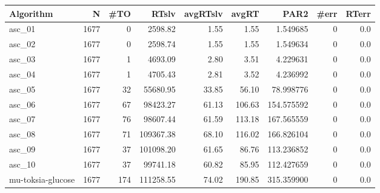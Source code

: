 \begin{tabular}{lrrrrrrrr}
\toprule
        Algorithm &    N &  \#TO &     RTslv &  avgRTslv &  avgRT &       PAR2 &  \#err &  RTerr \\
\midrule
           asc\_01 & 1677 &    0 &   2598.82 &      1.55 &   1.55 &   1.549685 &     0 &    0.0 \\
           asc\_02 & 1677 &    0 &   2598.74 &      1.55 &   1.55 &   1.549634 &     0 &    0.0 \\
           asc\_03 & 1677 &    1 &   4693.09 &      2.80 &   3.51 &   4.229631 &     0 &    0.0 \\
           asc\_04 & 1677 &    1 &   4705.43 &      2.81 &   3.52 &   4.236992 &     0 &    0.0 \\
           asc\_05 & 1677 &   32 &  55680.95 &     33.85 &  56.10 &  78.998776 &     0 &    0.0 \\
           asc\_06 & 1677 &   67 &  98423.27 &     61.13 & 106.63 & 154.575592 &     0 &    0.0 \\
           asc\_07 & 1677 &   76 &  98607.44 &     61.59 & 113.18 & 167.565559 &     0 &    0.0 \\
           asc\_08 & 1677 &   71 & 109367.38 &     68.10 & 116.02 & 166.826104 &     0 &    0.0 \\
           asc\_09 & 1677 &   37 & 101098.20 &     61.65 &  86.76 & 113.236852 &     0 &    0.0 \\
           asc\_10 & 1677 &   37 &  99741.18 &     60.82 &  85.95 & 112.427659 &     0 &    0.0 \\
mu-toksia-glucose & 1677 &  174 & 111258.55 &     74.02 & 190.85 & 315.359900 &     0 &    0.0 \\
\bottomrule
\end{tabular}
